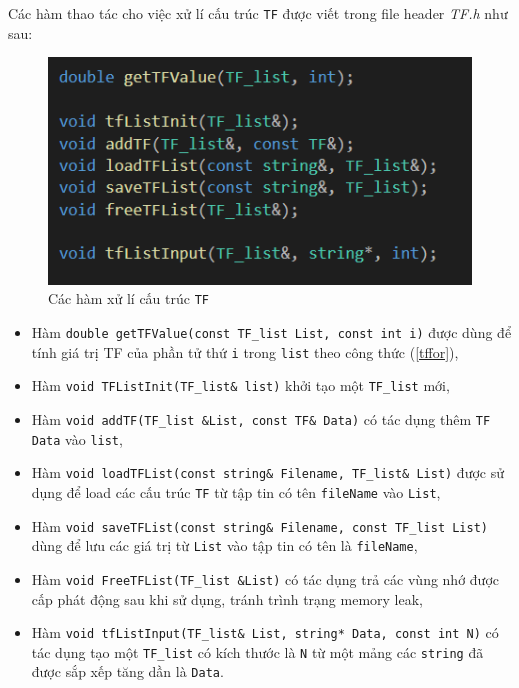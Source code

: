 \documentclass[12pt,a4paper]{article}
\begin{document}
Các hàm thao tác cho việc xử lí cấu trúc  \lstinline{TF} được viết trong file header \textit{TF.h} như sau:
\begin{figure}[H]
\begin{center}
\includegraphics[scale=1]{Fig5}
\end{center}
\caption{Các hàm xử lí cấu trúc \lstinline{TF}}
\label{tffunc}
\end{figure}
\begin{itemize}
\item Hàm \lstinline{double getTFValue(const TF_list List, const int i)} được dùng để tính giá trị TF của phần tử thứ \lstinline{i} trong \lstinline{list} theo công thức (\ref{tffor}),
\item Hàm \lstinline{void TFListInit(TF_list& list)} khởi tạo một \lstinline{TF_list} mới,
\item Hàm \lstinline{void addTF(TF_list &List, const TF& Data)} có tác dụng thêm \lstinline{TF} \lstinline{Data} vào \lstinline{list},
\item Hàm \lstinline{void loadTFList(const string& Filename, TF_list& List)} được sử dụng để load các cấu trúc \lstinline{TF} từ tập tin có tên \lstinline{fileName} vào \lstinline{List},
\item Hàm \lstinline{void saveTFList(const string& Filename, const TF_list List)} dùng để lưu các giá trị từ \lstinline{List} vào tập tin có tên là \lstinline{fileName},
\item Hàm \lstinline{void FreeTFList(TF_list &List)} có tác dụng trả các vùng nhớ được cấp phát động sau khi sử dụng, tránh trình trạng memory leak,
\item Hàm \lstinline{void tfListInput(TF_list& List, string* Data, const int N)} có tác dụng tạo một \lstinline{TF_list} có kích thước là \lstinline{N} từ một mảng các \lstinline{string} đã được sắp xếp tăng dần là \lstinline{Data}.
\end{itemize}
\end{document}
